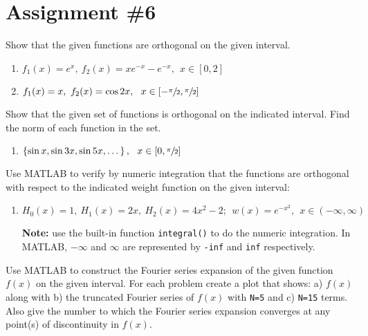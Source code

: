 \chapter{Assignment \#6}
\label{ch:ass6}
\begin{fullwidth}

Show that the given functions are orthogonal on the given interval.
\begin{enumerate}
\item $f_1(x) = e^{x}, \ f_2(x)=xe^{-x}-e^{-x}, \ \ x\in[0,2]$

\vspace{1.0cm}

\item $f_1(x) = x, \ f_2(x)=\cos{2x}, \ \ x\in\left[-\sfrac{\pi}{2},\sfrac{\pi}{2}\right]$
\end{enumerate}

\vspace{1.50cm}

\noindent Show that the given set of functions is orthogonal on the indicated interval.  Find the norm of each function in the set.
\begin{enumerate}[resume]
\item $\left\{\sin{x},\sin{3x},\sin{5x},\dots \right\}, \ \ x\in\left[0,\sfrac{\pi}{2}\right]$

\end{enumerate}

\vspace{1.5cm}

\noindent Use MATLAB to verify by numeric integration that the functions are orthogonal with respect to the indicated weight function on the given interval:

\begin{enumerate}[resume]
\item $H_0(x) = 1, \ H_1(x) = 2x, \ H_2(x)=4x^2-2; \ \ w(x)=e^{-x^2}, \ \ x\in(-\infty,\infty)$

\noindent\textbf{Note:} use the built-in function \lstinline{integral()} to do the numeric integration.  In MATLAB, $-\infty$ and $\infty$ are represented by \lstinline{-inf} and \lstinline{inf} respectively.
\end{enumerate}


\vspace{1.5cm}

\noindent Use MATLAB to construct the Fourier series expansion of the given function $f(x)$ on the given interval.  For each problem create a plot that shows: a) $f(x)$ along with b) the truncated Fourier series of $f(x)$ with \lstinline{N=5} and c) \lstinline{N=15} terms.  Also give the number to which the Fourier series expansion converges at any point(s) of discontinuity in $f(x)$. 


\end{fullwidth}
